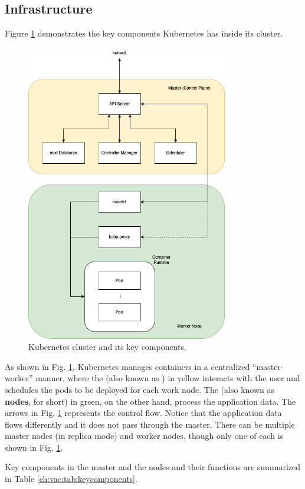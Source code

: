 \subsection{Infrastructure}

Figure \ref{ch:vac:fig:kubernetescluster} demonstrates the key components Kubernetes has inside its cluster.
\begin{figure}[!htb]
	\centering
	\includegraphics[width=250pt]{chapters/part-3/figures/k8sarchitecture.png}
	\caption{Kubernetes cluster and its key components.} \label{ch:vac:fig:kubernetescluster}
\end{figure}
As shown in Fig. \ref{ch:vac:fig:kubernetescluster}, Kubernetes manages containers in a centralized ``master-worker'' manner, where the  (also known as ) in yellow interacts with the user and schedules the pods to be deployed for each work node. The  (also known as \textbf{nodes}, for short) in green, on the other hand, process the application data. The arrows in Fig. \ref{ch:vac:fig:kubernetescluster} represents the control flow. Notice that the application data flows differently and it does not pass through the master. There can be multiple master nodes (in replica mode) and worker nodes, though only one of each is shown in Fig. \ref{ch:vac:fig:kubernetescluster}.

Key components in the master and the nodes and their functions are summarized in Table \ref{ch:vac:tab:keycomponents}.

